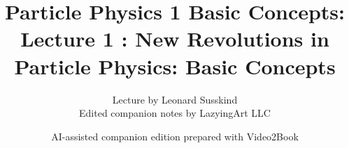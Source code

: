 \documentclass[11pt,oneside]{book}
\begin{document}
\frontmatter
\title{Particle Physics 1 Basic Concepts: Lecture 1 : New Revolutions in Particle Physics: Basic Concepts}
\author{Lecture by Leonard Susskind\\Edited companion notes by LazyingArt LLC}
\date{AI-assisted companion edition prepared with Video2Book}
\maketitle
\clearpage
\mainmatter

\end{document}
